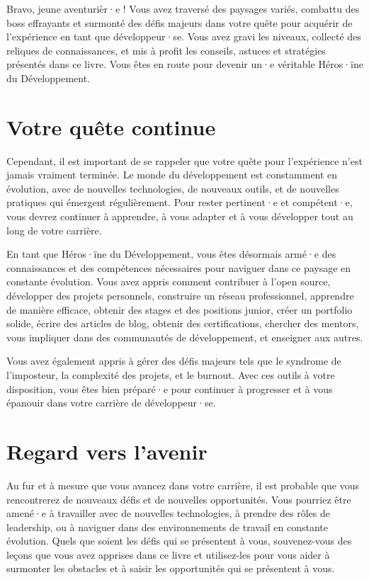 Bravo, jeune aventurièr·e ! Vous avez traversé des paysages variés, combattu des boss effrayants et surmonté des défis majeurs dans votre quête pour acquérir de l'expérience en tant que développeur·se. Vous avez gravi les niveaux, collecté des reliques de connaissances, et mis à profit les conseils, astuces et stratégies présentés dans ce livre. Vous êtes en route pour devenir un·e véritable Héros·ïne du Développement.

\section*{Votre quête continue}

Cependant, il est important de se rappeler que votre quête pour l'expérience n'est jamais vraiment terminée. Le monde du développement est constamment en évolution, avec de nouvelles technologies, de nouveaux outils, et de nouvelles pratiques qui émergent régulièrement. Pour rester pertinent·e et compétent·e, vous devrez continuer à apprendre, à vous adapter et à vous développer tout au long de votre carrière.

En tant que Héros·ïne du Développement, vous êtes désormais armé·e des connaissances et des compétences nécessaires pour naviguer dans ce paysage en constante évolution. Vous avez appris comment contribuer à l'open source, développer des projets personnels, construire un réseau professionnel, apprendre de manière efficace, obtenir des stages et des positions junior, créer un portfolio solide, écrire des articles de blog, obtenir des certifications, chercher des mentors, vous impliquer dans des communautés de développement, et enseigner aux autres.

Vous avez également appris à gérer des défis majeurs tels que le syndrome de l'imposteur, la complexité des projets, et le burnout. Avec ces outils à votre disposition, vous êtes bien préparé·e pour continuer à progresser et à vous épanouir dans votre carrière de développeur·se.

\section*{Regard vers l'avenir}

Au fur et à mesure que vous avancez dans votre carrière, il est probable que vous rencontrerez de nouveaux défis et de nouvelles opportunités. Vous pourriez être amené·e à travailler avec de nouvelles technologies, à prendre des rôles de leadership, ou à naviguer dans des environnements de travail en constante évolution. Quels que soient les défis qui se présentent à vous, souvenez-vous des leçons que vous avez apprises dans ce livre et utilisez-les pour vous aider à surmonter les obstacles et à saisir les opportunités qui se présentent à vous.

